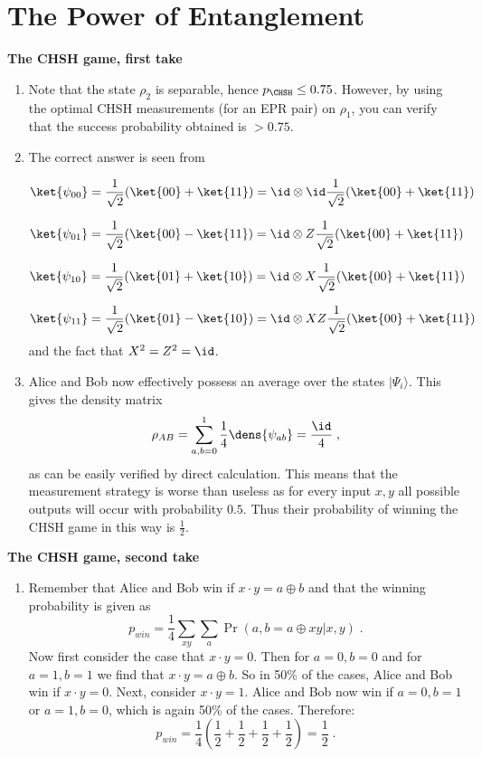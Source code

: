 
\chapter{The Power of Entanglement}

\begin{exercises}


\item {\bf The CHSH game, first take}
\begin{enumerate}
\item  Note that the state \(\rho_2\) is separable, hence \(p_{\CHSH}\leq 0.75\). However, by using the optimal CHSH measurements (for an EPR pair) on $\rho_1$, you can verify that the success probability obtained is $> 0.75$.

\item The correct answer is seen from
	
	\[\ket{\psi_{00}} = \frac{1}{\sqrt{2}}(\ket{00} + \ket{11}) = \id\otimes\id\frac{1}{\sqrt{2}}(\ket{00} + \ket{11}) \]
	
	\[\ket{\psi_{01}} = \frac{1}{\sqrt{2}}(\ket{00} - \ket{11}) = \id\otimes Z\frac{1}{\sqrt{2}}(\ket{00} + \ket{11}) \]
	
	\[\ket{\psi_{10}} = \frac{1}{\sqrt{2}}(\ket{01} + \ket{10})= \id\otimes X\frac{1}{\sqrt{2}}(\ket{00} + \ket{11}) \]
	
	\[\ket{\psi_{11}} = \frac{1}{\sqrt{2}}(\ket{01} - \ket{10})= \id\otimes XZ\frac{1}{\sqrt{2}}(\ket{00} + \ket{11}) \] and the fact that \(X^2 = Z^2 = \id\).

\item Alice and Bob now effectively possess an average over the states \(|\Psi_i\rangle\). This gives the density matrix \[\rho_{AB} = \sum_{a,b=0}^1 \frac{1}{4}\dens{\psi_{ab}} = \frac{\id}{4}\;,\] as can be easily verified by direct calculation. This means that the measurement strategy is worse than useless as for every input \(x,y\) all possible outputs will occur with probability \(0.5\). Thus their probability of winning the CHSH game in this way is \(\frac{1}{2}\).
\end{enumerate}


\item {\bf The CHSH game, second take}
\begin{enumerate}
	\item Remember that Alice and Bob win if $x\cdot y= a\oplus b$ and that the winning probability is given as $$p_{win}=\frac{1}{4}\sum_{xy}\sum_{a}\Pr\left(a,b=a\oplus xy|x,y\right)\;.$$ Now first consider the case that $x\cdot y=0$. Then for $a=0,b=0$ and for $a=1,b=1$ we find that $x\cdot y= a\oplus b$. So in 50\% of the cases, Alice and Bob win if $x\cdot y=0$. Next, consider $x\cdot y = 1$. Alice and Bob now win if $a=0,b=1$ or $a=1,b=0$, which is again 50\% of the cases. Therefore: $$p_{win}=\frac{1}{4}\left(\frac{1}{2}+\frac{1}{2}+\frac{1}{2}+\frac{1}{2}\right)=\frac{1}{2}\;.$$
	

\end{enumerate}
\end{exercises}
